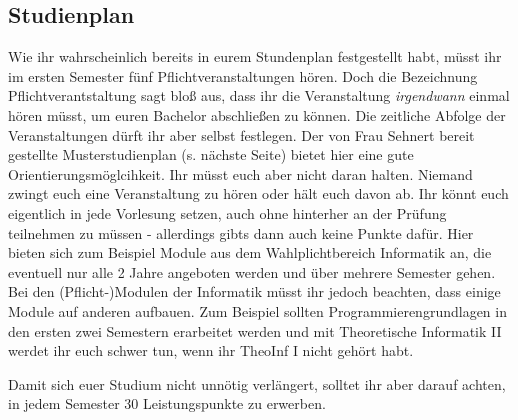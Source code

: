 \subsection{Studienplan}
\label{bach_studienplan}
Wie ihr wahrscheinlich bereits in eurem Stundenplan festgestellt habt, müsst ihr im ersten Semester fünf Pflichtveranstaltungen hören.
Doch die Bezeichnung Pflichtverantstaltung sagt bloß aus, dass ihr die Veranstaltung \emph{irgendwann} einmal hören müsst, um euren Bachelor abschließen zu können.
Die zeitliche Abfolge der Veranstaltungen dürft ihr aber selbst festlegen.
Der von Frau Sehnert bereit gestellte Musterstudienplan (s. nächste Seite) bietet hier eine gute Orientierungsmöglcihkeit.
Ihr müsst euch aber nicht daran halten. Niemand zwingt euch eine Veranstaltung zu hören oder hält euch davon ab.
Ihr könnt euch eigentlich in jede Vorlesung setzen, auch ohne hinterher an der Prüfung teilnehmen zu müssen - allerdings gibts dann auch keine Punkte dafür.
Hier bieten sich zum Beispiel Module aus dem Wahlplichtbereich Informatik an, die eventuell nur alle 2 Jahre angeboten werden und über mehrere Semester gehen.
Bei den (Pflicht-)Modulen der Informatik müsst ihr jedoch beachten, dass einige Module auf anderen aufbauen.
Zum Beispiel sollten Programmierengrundlagen in den ersten zwei Semestern erarbeitet werden und mit Theoretische Informatik II werdet ihr euch schwer tun, wenn ihr TheoInf I nicht gehört habt.

Damit sich euer Studium nicht unnötig verlängert, solltet ihr aber darauf achten, in jedem Semester 30 Leistungspunkte zu erwerben. 





